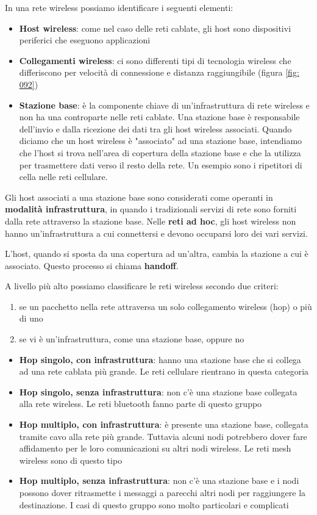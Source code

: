 \documentclass[11pt,a4paper]{article}
\begin{document}
In una rete wireless possiamo identificare i seguenti elementi: 
\begin{itemize}
	\item \textbf{Host wireless}: come nel caso delle reti cablate, gli host sono dispositivi periferici che eseguono applicazioni
	\item \textbf{Collegamenti wireless}: ci sono differenti tipi di tecnologia wireless che differiscono per velocità di connessione e distanza raggiungibile (figura \ref{fig: 092})
	\item \textbf{Stazione base}: è la componente chiave di un'infrastruttura di rete wireless e non ha una controparte nelle reti cablate. Una stazione base è responsabile dell'invio e dalla ricezione dei dati tra gli host wireless associati. Quando diciamo che un host wireless è "associato" ad una stazione base, intendiamo che l'host si trova nell'area di copertura della stazione base e che la utilizza per trasmettere dati verso il resto della rete. Un esempio sono i ripetitori di cella nelle reti cellulare. 
\end{itemize}

Gli host associati a una stazione base sono considerati come operanti in \textbf{modalità infrastruttura}, in quando i tradizionali servizi di rete sono forniti dalla rete attraverso la stazione base. Nelle \textbf{reti ad hoc}, gli host wireless non hanno un'infrastruttura a cui connettersi e devono occuparsi loro dei vari servizi.

L'host, quando si sposta da una copertura ad un'altra, cambia la stazione a cui è associato. Questo processo si chiama \textbf{handoff}.

A livello più alto possiamo classificare le reti wireless secondo due criteri:
\begin{enumerate}
	\item se un pacchetto nella rete attraversa un solo collegamento wireless (hop) o più di uno
	\item se vi è un'infrastruttura, come una stazione base, oppure no
\end{enumerate}

\begin{itemize}
	\item \textbf{Hop singolo, con infrastruttura}: hanno una stazione base che si collega ad una rete cablata più grande. Le reti cellulare rientrano in questa categoria
	\item \textbf{Hop singolo, senza infrastruttura}: non c'è una stazione base collegata alla rete wireless. Le reti bluetooth fanno parte di questo gruppo
	\item \textbf{Hop multiplo, con infrastruttura}: è presente una stazione base, collegata tramite cavo alla rete più grande. Tuttavia alcuni nodi potrebbero dover fare affidamento per le loro comunicazioni su altri nodi wireless. Le reti mesh wireless sono di questo tipo
	\item \textbf{Hop multiplo, senza infrastruttura}: non c'è una stazione base e i nodi possono dover ritrasmette i messaggi a parecchi altri nodi per raggiungere la destinazione.  I casi di questo gruppo sono molto particolari e complicati
\end{itemize}
\end{document}
